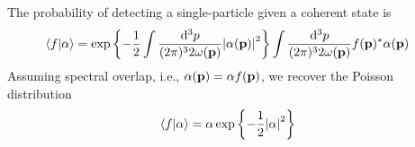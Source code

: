 \begin{lemma}
	The probability of detecting a single-particle given a coherent state is
	\begin{equation}
		\begin{split}
			\braket{f}{\alpha}
			&=
			\exp\left\{
				-
				\frac{1}{2}
				\int\frac{\dd[3]{p}}{(2\pi)^32\omega(\vb{p})}
				\abs{\alpha(\vb{p})}^2
			\right\}
			\int\frac{\dd[3]{p}}{(2\pi)^32\omega(\vb{p})}
			f(\vb{p})^*
			\alpha(\vb{p})
		\end{split}
	\end{equation}
	Assuming spectral overlap, i.e., $\alpha(\vb{p})=\alpha f(\vb{p})$, we recover the Poisson distribution
	\begin{equation}
		\begin{split}
			\braket{f}{\alpha}
			&=
			\alpha
			\exp\left\{
				-
				\frac{1}{2}
				\abs{\alpha}^2
			\right\}
		\end{split}
	\end{equation}
\end{lemma}
